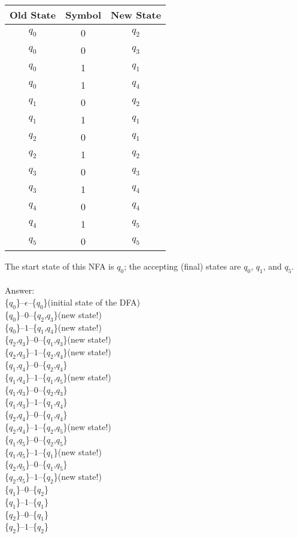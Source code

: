 \documentclass[12pt]{article}
\begin{document}
\begin{tabular}{ccc}
Old State & Symbol & New State \\
\hline
$q_0$ & 0 & $q_2$ \\
$q_0$ & 0 & $q_3$ \\
$q_0$ & 1 & $q_1$ \\
$q_0$ & 1 & $q_4$ \\
$q_1$ & 0 & $q_2$ \\
$q_1$ & 1 & $q_1$ \\
$q_2$ & 0 & $q_1$ \\
$q_2$ & 1 & $q_2$ \\
$q_3$ & 0 & $q_3$ \\
$q_3$ & 1 & $q_4$ \\
$q_4$ & 0 & $q_4$ \\
$q_4$ & 1 & $q_5$ \\
$q_5$ & 0 & $q_5$
\end{tabular}

The start state of this NFA is $q_0$; the accepting (final) states are $q_0$, $q_1$, and $q_5$.\\\\
  
\noindent Answer:\\
\noindent\{$q_0$\}--$\epsilon$--\{$q_0$\}(initial state of the DFA)\\
\{$q_0$\}--$0$--\{$q_2$,$q_3$\}(new state!)\\
\{$q_0$\}--$1$--\{$q_1$,$q_4$\}(new state!)\\
\{$q_2$,$q_3$\}--$0$--\{$q_1$,$q_3$\}(new state!)\\
\{$q_2$,$q_3$\}--$1$--\{$q_2$,$q_4$\}(new state!)\\
\{$q_1$,$q_4$\}--$0$--\{$q_2$,$q_4$\}\\
\{$q_1$,$q_4$\}--$1$--\{$q_1$,$q_5$\}(new state!)\\
\{$q_1$,$q_3$\}--$0$--\{$q_2$,$q_3$\}\\
\{$q_1$,$q_3$\}--$1$--\{$q_1$,$q_4$\}\\
\{$q_2$,$q_4$\}--$0$--\{$q_1$,$q_4$\}\\
\{$q_2$,$q_4$\}--$1$--\{$q_2$,$q_5$\}(new state!)\\
\{$q_1$,$q_5$\}--$0$--\{$q_2$,$q_5$\}\\
\{$q_1$,$q_5$\}--$1$--\{$q_1$\}(new state!)\\
\{$q_2$,$q_5$\}--$0$--\{$q_1$,$q_5$\}\\
\{$q_2$,$q_5$\}--$1$--\{$q_2$\}(new state!)\\
\{$q_1$\}--$0$--\{$q_2$\}\\
\{$q_1$\}--$1$--\{$q_1$\}\\
\{$q_2$\}--$0$--\{$q_1$\}\\
\{$q_2$\}--$1$--\{$q_2$\}\\
\end{document}
